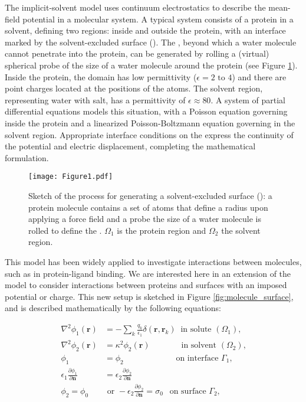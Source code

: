 
The implicit-solvent model uses continuum electrostatics to describe the mean-field potential in a molecular system. A typical system consists of a protein in a solvent, defining two regions: inside and outside the protein, with an interface marked by the solvent-excluded surface (\ses).  The \ses, beyond which a water molecule cannot penetrate into the protein, can be generated by rolling a (virtual) spherical probe of the size of a water molecule around the protein (see Figure \ref{fig:forcefield-ses}). Inside the protein, the domain has low permittivity ($\epsilon= 2\text{ to }4$) and there are point charges located at the positions of the atoms. The solvent region, representing water with salt, has a permittivity of $\epsilon \approx 80$. A system of partial differential equations models this situation, with a Poisson equation governing inside the protein and a linearized Poisson-Boltzmann equation governing in the solvent region. Appropriate interface conditions on the \ses express the continuity of the potential and electric displacement, completing the mathematical formulation.

\begin{figure}%
   \texttt{[image: Figure1.pdf]} 
   \caption{Sketch of the process for generating a solvent-excluded surface (\ses): a protein molecule contains a set of atoms that define a radius upon applying a force field and a probe the size of a water molecule is rolled to define the  \ses. $\Omega_1$ is the protein region and $\Omega_2$ the solvent region.}
   \label{fig:forcefield-ses}
\end{figure}

This model has been widely applied to investigate interactions between molecules, such as in protein-ligand binding. We are interested here in an extension of the model to consider interactions between  proteins and surfaces with an imposed potential or charge. This new setup is sketched in Figure \ref{fig:molecule_surface}, and is described mathematically by the following equations:


\begin{align} \label{eq:pde}
\nabla^2 \phi_1(\mathbf{r}) &= - \sum_k \frac{q_k}{\epsilon_1} \delta(\mathbf{r},\mathbf{r}_k) \ \text{ in solute $(\Omega_1)$,}  \nonumber \\ 
\nabla^2\phi_2 (\mathbf{r}) &= \kappa^2 \phi_2(\mathbf{r}) \quad \qquad \ \ \text{ in solvent $(\Omega_2)$,}  \nonumber \\ 
\phi_1 &=\phi_2 \qquad \qquad \qquad \text{ on interface $\Gamma_1$,}  \nonumber \\ 
\epsilon_1 \frac{\partial \phi_1}{\partial \mathbf{n}} &= \epsilon_2 \frac{\partial \phi_2}{\partial \mathbf{n}} \nonumber \\
\phi_2 = \phi_0 &\text{ or } -\epsilon_2 \frac{\partial \phi_2}{\partial \mathbf{n}} = \sigma_0 \ \ \text{ on surface $\Gamma_2$,} 
\end{align}

